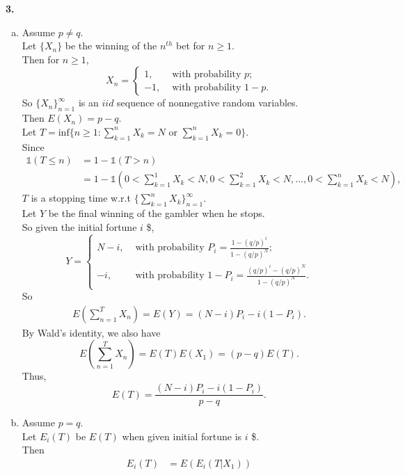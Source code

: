 \documentclass{extarticle}
\newcommand{\idca}{\mathbb{1}}
\theoremstyle{plain}
\theoremstyle{definition}
\begin{document}
\noindent \textbf{3.}\\
\begin{enumerate}[(a)]
	\item
	  Assume $p \neq q$.\\
	  Let $\{X_n\}$ be the winning of the $n^{th}$ bet for $n \geq 1$.\\
	  Then for $n \geq 1$, 
	  \[ X_n = \left\{ 
	  	  \begin{array}{cc}
	  	  	1,& \text{ with probability }p;\\
	  	  	-1,& \text{ with probability }1-p. 
	  	  \end{array}
	  	  	\right.
	  \]
	  So $\{X_n\}_{n=1}^{\infty}$ is an $iid$ sequence of nonnegative random variables.\\
	  Then $E(X_n) = p-q$.\\
	  Let $T=\text{inf}\{n\geq 1: \sum_{k=1}^{n}X_k = N \text{ or } \sum_{k=1}^{n}X_k = 0\}$.\\
	  Since 
	  \begin{align*}
	  	\idca(T \leq n) &= 1- \idca(T > n) \\
	  					&= 1-\idca(0< \sum_{k=1}^{1}X_k <N, 0< \sum_{k=1}^{2}X_k <N, ..., 0< \sum_{k=1}^{n}X_k <N),
	  \end{align*}
	  $T$ is a stopping time w.r.t $\{\sum_{k=1}^{n}X_k\}_{n=1}^{\infty}$.\\
	  Let $Y$ be the final winning of the gambler when he stops.\\
	  So given the initial fortune $i$ \$, 
	  \[ Y = \left\{ 
	  	  \begin{array}{cc}
	  	  	N-i,& \text{ with probability } P_i = \frac{1-(q/p)^i}{1-(q/p)^N};\\
	  	  	-i,& \text{ with probability } 1-P_i = \frac{(q/p)^i-(q/p)^N}{1-(q/p)^N}. 
	  	  \end{array}
	  	  	\right.
	  \]
	  So 
	  \begin{align*}
  			E\left( \sum_{n=1}^{T}X_n\right) = E(Y) = (N-i)P_i -i(1-P_i).
	  \end{align*}
	  By Wald's identity, we also have
	  \[E\left( \sum_{n=1}^{T}X_n\right) = E(T)E(X_1) = (p-q)E(T).\]
	 Thus,
	 \[E(T) = \frac{(N-i)P_i -i(1-P_i)}{p-q}.\]
	\item
		Assume $p=q$.\\
	  	Let $E_i(T)$ be $E(T)$ when given initial fortune is $i$ \$.\\
	  	Then 
	  	\begin{align*}
	  	  E_i(T) &= E\left(E_i(T|X_1)\right) \\

\end{align*}
\end{enumerate}
\end{document}
